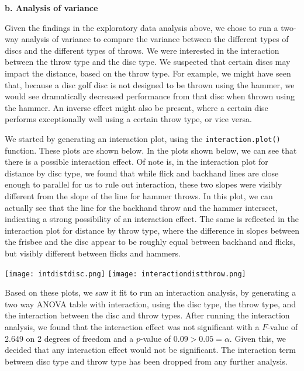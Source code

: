 \documentclass[letter,12pt]{article}
\begin{document}
	\begin{center}
		\textbf{b. Analysis of variance}\par
	\end{center}
	\justify
	Given the findings in the exploratory data analysis above, we chose to run a two-way analysis of variance to compare the variance between the different types of discs and the different types of throws. We were interested in the interaction between the throw type and the disc type. We suspected that certain discs may impact the distance, based on the throw type. For example, we might have seen that, because a disc golf disc is not designed to be thrown using the hammer, we would see dramatically decreased performance from that disc when thrown using the hammer. An inverse effect might also be present, where a certain disc performs exceptionally well using a certain throw type, or vice versa.\par
  We started by generating an interaction plot, using the \verb!interaction.plot()! function. These plots are shown below. In the plots shown below, we can see that there is a possible interaction effect. Of note is, in the interaction plot for distance by disc type, we found that while flick and backhand lines are close enough to parallel for us to rule out interaction, these two slopes were visibly different from the slope of the line for hammer throws. In this plot, we can actually see that the line for the backhand throw and the hammer intersect, indicating a strong possibility of an interaction effect. The same is reflected in the interaction plot for distance by throw type, where the difference in slopes between the frisbee and the disc appear to be roughly equal between backhand and flicks, but visibly different between flicks and hammers.\par
  \begin{center}
    \texttt{[image: intdistdisc.png]}
    \texttt{[image: interactiondistthrow.png]}
  \end{center}
  Based on these plots, we saw it fit to run an interaction analysis, by generating a two way ANOVA table with interaction, using the disc type, the throw type, and the interaction between the disc and throw types. After running the interaction analysis, we found that the interaction effect was not significant with a $F$-value of 2.649 on 2 degrees of freedom and a $p$-value of $0.09 > 0.05 = \alpha$. Given this, we decided that any interaction effect would not be significant. The interaction term between disc type and throw type has been dropped from any further analysis.\par
\end{document}
